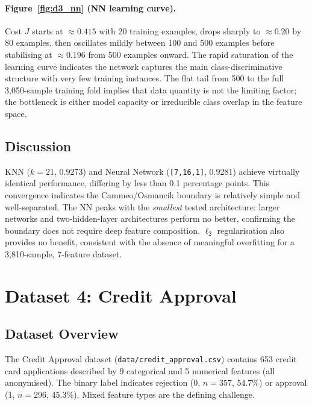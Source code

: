 \documentclass[11pt,letterpaper]{article}
\begin{document}
\paragraph{Figure~\ref{fig:d3_nn} (NN learning curve).}
Cost $J$ starts at $\approx\!0.415$ with 20 training examples, drops sharply
to $\approx\!0.20$ by 80 examples, then oscillates mildly between 100 and 500
examples before stabilising at $\approx\!0.196$ from 500 examples onward.
The rapid saturation of the learning curve indicates the network captures the
main class-discriminative structure with very few training instances.  The
flat tail from 500 to the full 3,050-sample training fold implies that data
quantity is not the limiting factor; the bottleneck is either model capacity
or irreducible class overlap in the feature space.

\subsection{Discussion}

KNN ($k=21$, 0.9273) and Neural Network (\texttt{[7,16,1]}, 0.9281) achieve
virtually identical performance, differing by less than 0.1 percentage points.
This convergence indicates the Cammeo/Osmancik boundary is relatively simple
and well-separated.  The NN peaks with the \emph{smallest} tested
architecture: larger networks and two-hidden-layer architectures perform no
better, confirming the boundary does not require deep feature composition.
$\ell_2$ regularisation also provides no benefit, consistent with the absence
of meaningful overfitting for a 3,810-sample, 7-feature dataset.

\section{Dataset 4: Credit Approval}

\subsection{Dataset Overview}

The Credit Approval dataset (\texttt{data/credit\_approval.csv}) contains
653 credit card applications described by 9 categorical and 5 numerical
features (all anonymised).  The binary label indicates rejection (0, $n=357$,
54.7\%) or approval (1, $n=296$, 45.3\%).  Mixed feature types are the
defining challenge.
\end{document}
